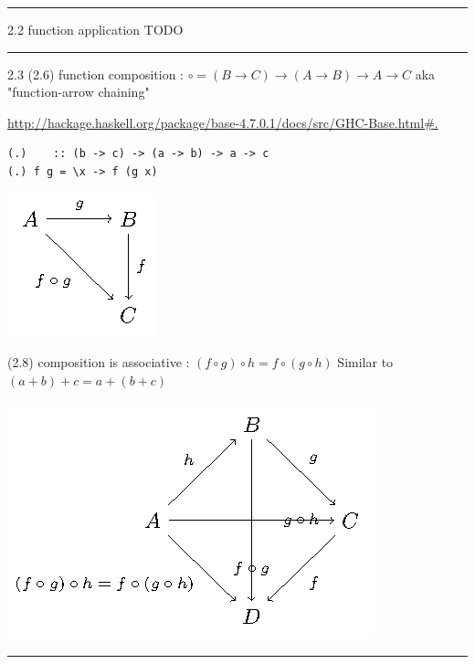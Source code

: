 \documentclass[presentation]{beamer}
\begin{document}
\rule{\linewidth}{0.5pt}
\begin{frame}[label=sec-1]{2.2 function application}
TODO

\rule{\linewidth}{0.5pt}
\end{frame}
\begin{frame}[fragile,label=sec-2]{2.3  (2.6) function composition : $\circ = (B \rightarrow C) \rightarrow (A \rightarrow B) \rightarrow A \rightarrow C$}
 aka "function-arrow chaining"

\url{http://hackage.haskell.org/package/base-4.7.0.1/docs/src/GHC-Base.html#.}

\begin{verbatim}
(.)    :: (b -> c) -> (a -> b) -> a -> c
(.) f g = \x -> f (g x)
\end{verbatim}

\includegraphics[width=.9\linewidth]{./function-composition.png}

\begin{block}{(2.8) composition is associative : $(f \circ g) \circ h = f \circ (g \circ h)$}
Similar to $(a + b) + c = a + (b + c)$

\includegraphics[width=.9\linewidth]{./function-composition-associative.png}

\rule{\linewidth}{0.5pt}
\end{block}
\end{frame}
\end{document}
